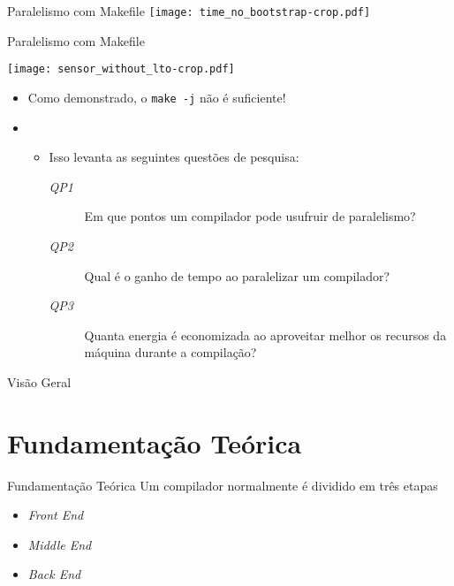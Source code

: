 \begin{frame}
    Paralelismo com Makefile
    \texttt{[image: time\_no\_bootstrap-crop.pdf]}
    \label{fig:analysis_classical}
\end{frame}

\begin{frame}
    Paralelismo com Makefile

    \centering
    \texttt{[image: sensor\_without\_lto-crop.pdf]}
    \label{fig:analysis_classical}
\end{frame}

\begin{frame}
    \begin{itemize}
        \item Como demonstrado, o \texttt{make -j} não é suficiente!
        \item[]
        \begin{itemize}
            \item Isso levanta as seguintes questões de pesquisa:
            \begin{description}
                \item[\textit{QP1}] Em que pontos um compilador pode usufruir de paralelismo?
                \item[\textit{QP2}] Qual é o ganho de tempo ao paralelizar um compilador?
                \item[\textit{QP3}] Quanta energia é economizada ao aproveitar melhor os recursos da máquina durante a compilação?
            \end{description}
        \end{itemize}
    \end{itemize}
\end{frame}



\begin{frame}{Visão Geral}
  \overview
\end{frame}

\section{Fundamentação Teórica}

\begin{frame}{Fundamentação Teórica}
  Um compilador normalmente é dividido em três etapas
  \begin{itemize}
    \item \textit{Front End}
    \item \textit{Middle End}
    \item \textit{Back End}
  \end{itemize}
\end{frame}


